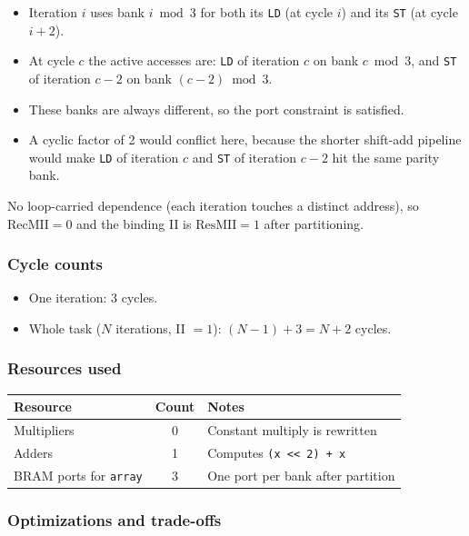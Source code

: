 \documentclass[11pt,a4paper]{article}
\begin{document}
\begin{itemize}[noitemsep]
  \item Iteration $i$ uses bank $i \bmod 3$ for both its \texttt{LD} (at cycle $i$) and its \texttt{ST} (at cycle $i+2$).
  \item At cycle $c$ the active accesses are: \texttt{LD} of iteration $c$ on bank $c \bmod 3$, and \texttt{ST} of iteration $c-2$ on bank $(c-2) \bmod 3$.
  \item These banks are always different, so the port constraint is satisfied.
  \item A cyclic factor of 2 would conflict here, because the shorter shift-add pipeline would make \texttt{LD} of iteration $c$ and \texttt{ST} of iteration $c-2$ hit the same parity bank.
\end{itemize}

No loop-carried dependence (each iteration touches a distinct address), so $\mathrm{RecMII} = 0$ and the binding II is $\mathrm{ResMII} = 1$ after partitioning.

\subsubsection*{Cycle counts}

\begin{itemize}[noitemsep]
  \item One iteration: 3 cycles.
  \item Whole task ($N$ iterations, II $=1$): $(N-1) + 3 = N+2$ cycles.
\end{itemize}

\subsubsection*{Resources used}

\begin{center}
\begin{tabular}{lcl}
\toprule
Resource & Count & Notes \\
\midrule
Multipliers              & 0 & Constant multiply is rewritten \\
Adders                   & 1 & Computes \texttt{(x \textless\textless\ 2) + x} \\
BRAM ports for \texttt{array} & 3 & One port per bank after partition \\
\bottomrule
\end{tabular}
\end{center}

\subsubsection*{Optimizations and trade-offs}
\end{document}
